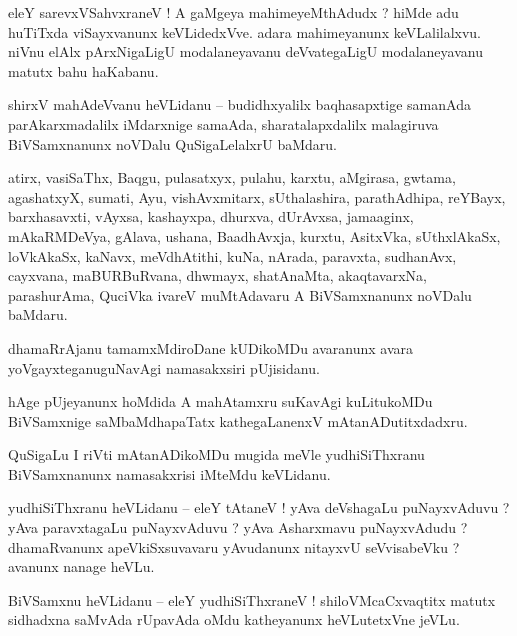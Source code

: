 \documentclass{article}
\begin{document}
\begin{mn}%
eleY sarevxVSahvxraneV ! A gaMgeya mahimeyeMthAdudx ? hiMde adu huTiTxda viSayxvanunx keVLidedxVve. 
adara mahimeyanunx keVLalilalxvu. niVnu elAlx  pArxNigaLigU modalaneyavanu deVvategaLigU 
modalaneyavanu matutx bahu haKabanu.
\end{mn}

\begin{mn}%
shirxV mahAdeVvanu heVLidanu -- budidhxyalilx baqhasapxtige samanAda parAkarxmadalilx iMdarxnige 
samaAda, sharatalapxdalilx malagiruva BiVSamxnanunx noVDalu QuSigaLelalxrU baMdaru.
\end{mn}

\begin{mn}%
atirx, vasiSaThx, Baqgu, pulasatxyx, pulahu, karxtu, aMgirasa, gwtama, agashatxyX, sumati, Ayu, 
vishAvxmitarx, sUthalashira, parathAdhipa, reYBayx, barxhasavxti, vAyxsa, kashayxpa, dhurxva, 
dUrAvxsa, jamaaginx, mAkaRMDeVya, gAlava, ushana, BaadhAvxja, kurxtu, AsitxVka, sUthxlAkaSx, 
loVkAkaSx, kaNavx, meVdhAtithi, kuNa, nArada, paravxta, sudhanAvx, cayxvana, maBURBuRvana, 
dhwmayx, shatAnaMta, akaqtavarxNa, parashurAma, QuciVka ivareV muMtAdavaru A BiVSamxnanunx noVDalu 
baMdaru.
\end{mn}

\begin{mn}%
dhamaRrAjanu tamamxMdiroDane kUDikoMDu avaranunx avara yoVgayxteganuguNavAgi namasakxsiri pUjisidanu.
\end{mn}

\begin{mn}%
hAge pUjeyanunx hoMdida A mahAtamxru suKavAgi kuLitukoMDu BiVSamxnige saMbaMdhapaTatx 
kathegaLanenxV mAtanADutitxdadxru.
\end{mn}

\begin{mn}%
QuSigaLu I riVti mAtanADikoMDu mugida meVle yudhiSiThxranu BiVSamxnanunx namasakxrisi iMteMdu 
keVLidanu.
\end{mn}

\begin{mn}%
yudhiSiThxranu heVLidanu -- eleY tAtaneV ! yAva deVshagaLu puNayxvAduvu ? yAva paravxtagaLu 
puNayxvAduvu ? yAva Asharxmavu puNayxvAdudu ? dhamaRvanunx apeVkiSxsuvavaru yAvudanunx nitayxvU 
seVvisabeVku ? avanunx nanage heVLu.
\end{mn}

\begin{mn}%
BiVSamxnu heVLidanu -- eleY yudhiSiThxraneV ! shiloVMcaCxvaqtitx matutx sidhadxna saMvAda rUpavAda 
oMdu katheyanunx heVLutetxVne jeVLu.
\end{mn}
\end{document}
